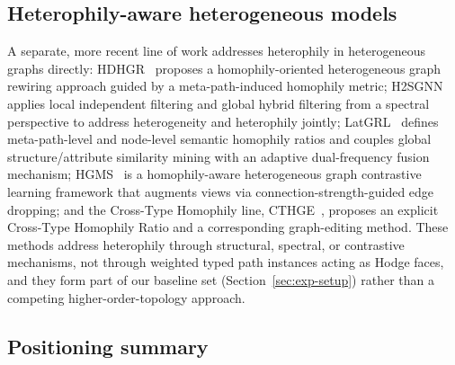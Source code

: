 \documentclass{article}
\begin{document}
\subsection{Heterophily-aware heterogeneous models}

A separate, more recent line of work addresses heterophily in heterogeneous graphs directly:
HDHGR~\citep{guo2023hdhgr} proposes a homophily-oriented heterogeneous graph rewiring approach
guided by a meta-path-induced homophily metric; H2SGNN~\citep{lu2024h2sgnn} applies local
independent filtering and global hybrid filtering from a spectral perspective to address
heterogeneity and heterophily jointly; LatGRL~\citep{shen2024latgrl} defines meta-path-level and
node-level semantic homophily ratios and couples global structure/attribute similarity mining with
an adaptive dual-frequency fusion mechanism; HGMS~\citep{wang2025hgms} is a homophily-aware
heterogeneous graph contrastive learning framework that augments views via connection-strength-guided
edge dropping; and the Cross-Type Homophily line, CTHGE~\citep{tao2025cthge}, proposes an explicit
Cross-Type Homophily Ratio and a corresponding graph-editing method. These methods address
heterophily through structural, spectral, or contrastive mechanisms, not through weighted typed
path instances acting as Hodge faces, and they form part of our baseline set
(Section~\ref{sec:exp-setup}) rather than a competing higher-order-topology approach.

\subsection{Positioning summary}
\end{document}
